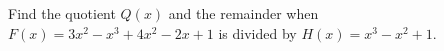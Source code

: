 Find the quotient $Q(x)$ and the remainder when $F(x)=3x^2-x^3+4x^2-2x+1$ is divided by $H(x)=x^3-x^2+1$.
